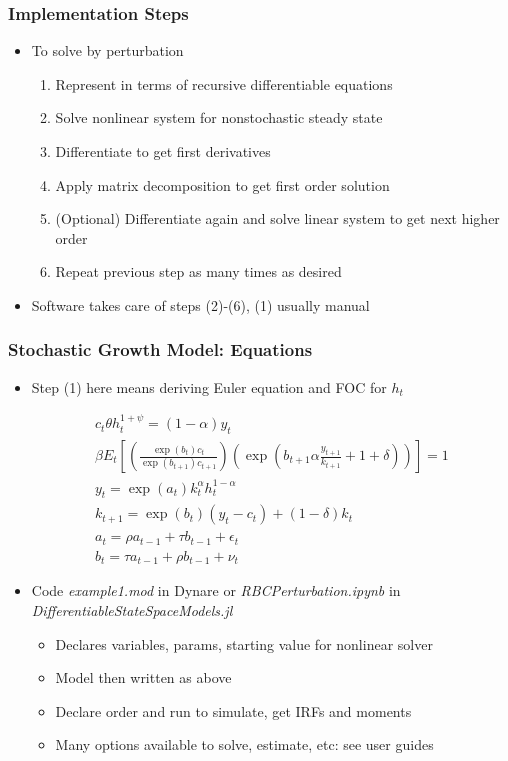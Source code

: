 \documentclass[bigger,handout]{beamer}
\begin{document}
\begin{frame}
\frametitle{Implementation Steps}
\begin{itemize}
\item To solve by perturbation
\begin{enumerate}
\item Represent in terms of recursive differentiable equations
\item Solve nonlinear system for nonstochastic steady state
\item Differentiate to get first derivatives
\item Apply matrix decomposition to get first order solution
\item (Optional) Differentiate again and solve linear system to get next higher order
\item Repeat previous step as many times as desired
\end{enumerate}
\item Software takes care of steps (2)-(6), (1) usually manual


\end{itemize}
\end{frame}

\begin{frame}
\frametitle{Stochastic Growth Model: Equations}
\begin{itemize}
\item Step (1) here means deriving Euler equation and FOC for $h_t$

\begin{align*}
c_t\theta h_{t}^{1+\psi}=(1-\alpha)y_t \\
\beta E_t\left[\left(\frac{\exp(b_t)c_t}{\exp(b_{t+1})c_{t+1}}\right)\left(\exp(b_{t+1}\alpha\frac{y_{t+1}}{k_{t+1}}+1+\delta)\right)\right]=1 \\
y_{t}=\exp(a_t)k_{t}^{\alpha}h_{t}^{1-\alpha} \\
k_{t+1}=\exp(b_t)(y_t-c_t)+(1-\delta)k_t \\
a_t = \rho a_{t-1} + \tau b_{t-1} +\epsilon_t \\
b_t = \tau a_{t-1} + \rho b_{t-1} +\nu_t
\end{align*}

\item Code \emph{example1.mod} in Dynare or \emph{RBCPerturbation.ipynb} in \emph{DifferentiableStateSpaceModels.jl}
\begin{itemize}
\item Declares variables, params, starting value for nonlinear solver
\item Model then written as above
\item Declare order and run to simulate, get IRFs and moments
\end{itemize}
\begin{itemize}
\item Many options available to solve, estimate, etc: see user guides
\end{itemize}


\end{itemize}
\end{frame}
\end{document}
